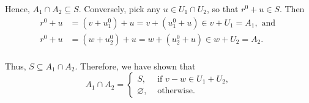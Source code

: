\begin{xrcs}
\begin{xprf}
    Hence, $A_1 \cap A_2 \subseteq S$. Conversely, pick any $u \in U_1 \cap U_2$, so that $r^0 + u \in S$. Then
    \begin{equation}
      \begin{aligned}
        r^0 + u &= (v + u_1^0) + u = v + ( u_1^0 + u) \in v + U_1 = A_1, \text{ and } \\
        r^0 + u &= (w + u_2^0) + u = w + ( u_2^0 + u) \in w + U_2 = A_2.  \\
      \end{aligned}
    \end{equation}

    Thus, $S \subseteq A_1 \cap A_2$. Therefore, we have shown that
    \begin{equation}
      A_1 \cap A_2 =
      \begin{cases}
        S,            & \text{ if } v-w \in U_1 + U_2, \\
        \varnothing,  & \text{ otherwise. }
      \end{cases}
    \end{equation}
  \end{xprf}
\end{xrcs}

